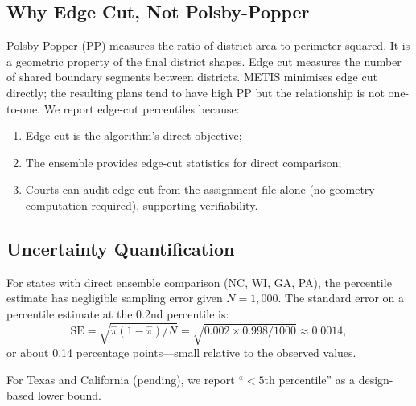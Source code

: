 \subsection{Why Edge Cut, Not Polsby-Popper}

Polsby-Popper (PP) measures the ratio of district area to perimeter squared.
It is a geometric property of the final district shapes.  Edge cut measures
the number of shared boundary segments between districts.  METIS minimises
edge cut directly; the resulting plans tend to have high PP but the
relationship is not one-to-one.  We report edge-cut percentiles because:
\begin{enumerate}
  \item Edge cut is the \ar{} algorithm's direct objective;
  \item The \recom{} ensemble provides edge-cut statistics for direct comparison;
  \item Courts can audit edge cut from the assignment file alone (no geometry
    computation required), supporting verifiability.
\end{enumerate}

\subsection{Uncertainty Quantification}

For states with direct ensemble comparison (NC, WI, GA, PA), the percentile
estimate has negligible sampling error given $N = 1{,}000$.  The standard error
on a percentile estimate at the 0.2nd percentile is:
\begin{equation}
  \mathrm{SE} = \sqrt{\hat\pi(1-\hat\pi)/N}
  = \sqrt{0.002 \times 0.998 / 1000} \approx 0.0014,
\end{equation}
or about 0.14 percentage points---small relative to the observed values.

For Texas and California (pending), we report ``$< 5$th percentile'' as a
design-based lower bound.
